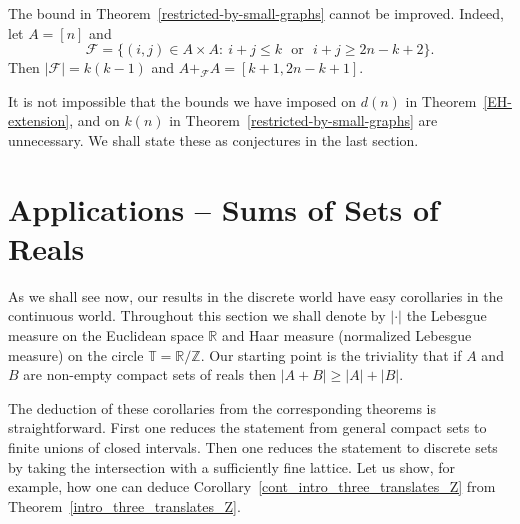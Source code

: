 \documentclass[12pt,reqno]{amsart}
\theoremstyle{definition}
\renewcommand\le{\leqslant}
\renewcommand\ge{\geqslant}
\begin{document}
\vspace{5pt}
The bound in Theorem~\ref{restricted-by-small-graphs} cannot be improved. Indeed, let $A=[n]$ and
\[
{\mathcal F}=\{(i,j)\in A\times A: \ i+j\le k \ \ \ \text{or} \ \ \ i+j\ge 2n-k+2\}.
\]
Then $\big|{\mathcal F}\big|=k(k-1)$ and $A+_{\mathcal F} A=[k+1, 2n-k+1]$.



\vspace{7pt}
It is not impossible that the bounds we have imposed on $d(n)$ in Theorem~\ref{EH-extension}, and on $k(n)$ in Theorem~\ref{restricted-by-small-graphs} are unnecessary. We shall state these as conjectures in the last section.




\section{Applications -- Sums of Sets of Reals}

As we shall see now, our results in the discrete world have easy corollaries in the continuous world. Throughout this section we shall denote by $|\cdot|$ the Lebesgue measure on the Euclidean space $\mathbb{R}$ and Haar measure (normalized Lebesgue measure) on the circle $\mathbb{T}=\mathbb{R}/\mathbb{Z}$. Our starting point is the triviality that if $A$ and $B$ are non-empty compact sets of reals then $|A+B| \ge |A|+|B|$.

The deduction of these corollaries from the corresponding theorems is straightforward. First one reduces the statement from general compact sets to finite unions of closed intervals. Then one reduces the statement to discrete sets by taking the intersection with a sufficiently fine lattice. Let us show, for example, how one can deduce Corollary~\ref{cont_intro_three_translates_Z} from Theorem~\ref{intro_three_translates_Z}.
\end{document}
